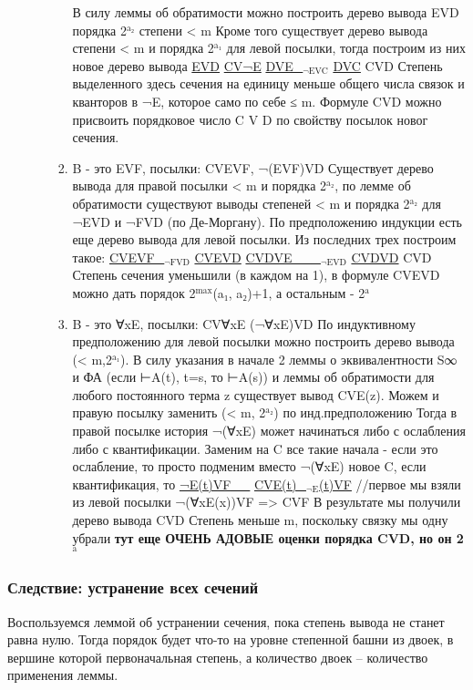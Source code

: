 \documentclass[11pt]{article}
\begin{document}
\begin{itemize}
\begin{enumerate}
\begin{enumerate}
В силу леммы об обратимости можно построить дерево вывода
EVD порядка 2$^{\text{a₂}}$ степени < m
Кроме того существует дерево вывода степени < m и порядка 2$^{\text{a₁}}$
для левой посылки, тогда построим из них новое дерево
вывода
\uline{EVD}   \uline{CV¬E}
\uline{DVE\_$_{\text{¬EVC}}$}
\uline{DVC}
CVD
Степень выделенного здесь сечения на единицу меньше общего
числа связок и кванторов в ¬E, которое само по себе ≤ m.
Формуле CVD можно присвоить порядковое число C V D по свойству
посылок новог сечения.
\item B - это EVF, посылки:
CVEVF, ¬(EVF)VD
Существует дерево вывода для правой посылки < m и порядка 2$^{\text{a₂}}$,
по лемме об обратимости существуют выводы степеней < m и порядка
2$^{\text{a₂}}$ для ¬EVD и ¬FVD (по Де-Моргану). По предположению индукции
есть еще дерево вывода для левой посылки.
Из последних трех построим такое:
\uline{CVEVF\_$_{\text{¬FVD}}$}
   \uline{CVEVD}
   \uline{CVDVE\_\_\_$_{\text{¬EVD}}$}
       \uline{CVDVD}
CVD
Степень сечения уменьшили (в каждом на 1), в формуле
CVEVD можно дать порядок 2$^{\text{max}}$(a₁, a₂)+1, а остальным - 2$^{\text{a}}$
\item B - это ∀xE, посылки:
CV∀xE  (¬∀xE)VD
По индуктивному предположению для левой посылки можно построить
дерево вывода (< m,2$^{\text{a₁}}$). В силу указания в начале 2 леммы о
эквивалентности S∞ и ФА (если ⊢A(t), t=s, то ⊢A(s)) и леммы
об обратимости для любого постоянного терма z существует вывод
CVE(z).
Можем и правую посылку заменить (< m, 2$^{\text{a₂}}$) по инд.предположению
Тогда в правой посылке история ¬(∀xE) может начинаться либо
с ослабления либо с квантификации.
Заменим на C все такие начала - если это ослабление, то просто
подменим вместо ¬(∀xE) новое C, если квантификация, то
\uline{¬E(t)VF\_\_}         \uline{CVE(t)\_$_{\text{¬E}}$(t)VF}   //первое мы взяли из левой посылки
¬(∀xE(x))VF   =>          CVF
В результате мы получили дерево вывода CVD
Степень меньше m, поскольку связку мы одну убрали
\textbf{тут еще ОЧЕНЬ АДОВЫЕ оценки порядка CVD, но он 2$^{\text{a}}$}
\end{enumerate}
\end{enumerate}
\end{itemize}
\subsubsection{Следствие: устранение всех сечений}
\label{sec-18-4-3}
Воспользуемся леммой об устранении сечения, пока степень вывода
не станет равна нулю. Тогда порядок будет что-то на уровне степенной
башни из двоек, в вершине которой первоначальная степень, а количество
двоек -- количество применения леммы.
\end{document}
